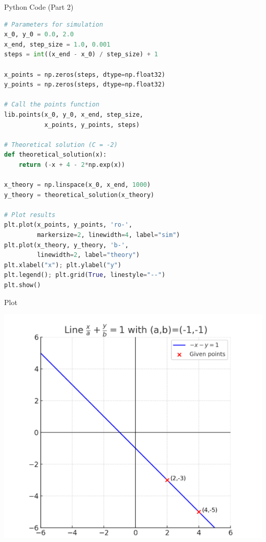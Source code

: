\documentclass{beamer}
\begin{document}
\begin{frame}[fragile]{Python Code (Part 2)}
\begin{lstlisting}[language=Python]
# Parameters for simulation
x_0, y_0 = 0.0, 2.0
x_end, step_size = 1.0, 0.001
steps = int((x_end - x_0) / step_size) + 1

x_points = np.zeros(steps, dtype=np.float32)
y_points = np.zeros(steps, dtype=np.float32)

# Call the points function
lib.points(x_0, y_0, x_end, step_size, 
           x_points, y_points, steps)

# Theoretical solution (C = -2)
def theoretical_solution(x):
    return (-x + 4 - 2*np.exp(x))

x_theory = np.linspace(x_0, x_end, 1000)
y_theory = theoretical_solution(x_theory)

# Plot results
plt.plot(x_points, y_points, 'ro-', 
         markersize=2, linewidth=4, label="sim")
plt.plot(x_theory, y_theory, 'b-', 
         linewidth=2, label="theory")
plt.xlabel("x"); plt.ylabel("y")
plt.legend(); plt.grid(True, linestyle="--")
plt.show()
\end{lstlisting}
\end{frame}


\begin{frame}{Plot}
\begin{center}
\includegraphics[width=0.8\columnwidth]{figs/plot6.png}
\end{center}
\end{frame}
\end{document}
